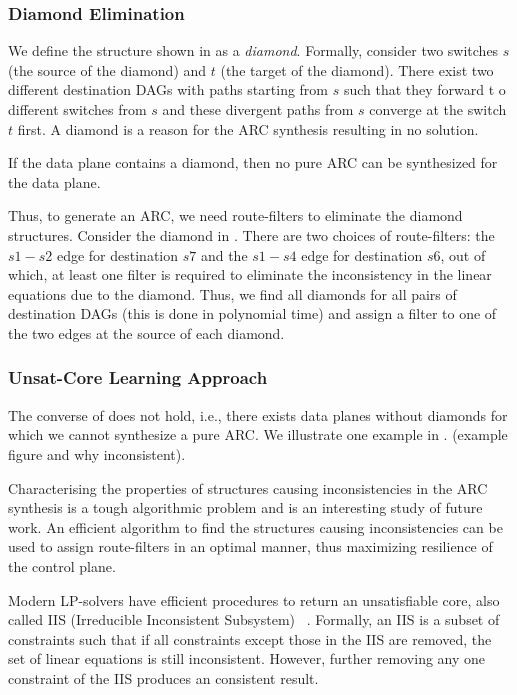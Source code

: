 \subsubsection{Diamond Elimination}
We define the structure shown in 
as a \emph{diamond}. Formally,
consider two switches $s$ (the source of the diamond) 
and $t$ (the target of the diamond).
There exist two different destination DAGs with 
paths starting from $s$ such that they forward t
o different switches from $s$  
and these divergent paths from $s$ converge
at the switch $t$ first. A diamond is 
a reason for the ARC synthesis resulting in no
solution. 
\begin{theorem} \label{thm:diamond}
If the data plane contains a diamond, then no pure ARC  
can be synthesized for the data plane.
\end{theorem}
Thus, to generate an ARC, we need route-filters
to eliminate the diamond structures. Consider
the diamond in . There are two choices
of route-filters: the $s1-s2$ edge for destination $s7$ 
and the $s1-s4$ edge for destination $s6$, out of which,
at least one filter is required to eliminate the 
inconsistency in the linear equations due to the diamond.
Thus, we find all diamonds for all pairs of destination
DAGs (this is done in polynomial time) and assign a filter
to one of the two edges at the source of each diamond. 

\subsubsection{Unsat-Core Learning Approach}
The converse of  does not hold, i.e.,
there exists data planes without diamonds for which
we cannot synthesize a pure ARC. We illustrate one example
in \Cref{}. (example figure and why inconsistent). 

Characterising the properties of structures causing
inconsistencies in the ARC synthesis is a tough algorithmic
problem and is an interesting study of future work. An
efficient algorithm to find the structures causing 
inconsistencies can be used to assign route-filters in an
optimal manner, thus maximizing resilience of the control plane.

Modern LP-solvers have efficient procedures to return an
unsatisfiable core, also called IIS (Irreducible Inconsistent Subsystem)
~\cite{iis}. Formally, an IIS is a subset of constraints such that
if all constraints except those in the IIS are removed, the set of
linear equations is still inconsistent. However, further removing 
any one constraint of the IIS produces an consistent result. 